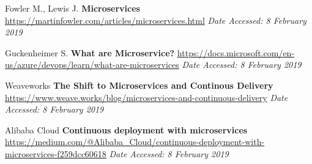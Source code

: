 \documentclass[12pt]{article}
\begin{document}
{\footnotesize
\begin{thebibliography}{9}
     Fowler M., Lewis J. \textbf{Microservices}
    \url{https://martinfowler.com/articles/microservices.html}
    \textit{Date Accessed: 8 February 2019}
  
    Guckenheimer S. \textbf{What are Microservice?}
    \url{https://docs.microsoft.com/en-us/azure/devops/learn/what-are-microservices}
    \textit{Date Accessed: 8 February 2019}
    

    Weaveworks \textbf{The Shift to Microservices and Continous Delivery}
    \url{https://www.weave.works/blog/microservices-and-continuous-delivery}
    \textit{Date Accessed: 8 February 2019}
    
    Alibaba Cloud \textbf{Continuous deployment with microservices}
    \url{https://medium.com/@Alibaba_Cloud/continuous-deployment-with-microservices-f259dcc60618}
    \textit{Date Accessed: 8 February 2019}
    
\end{thebibliography}
}
\end{document}
